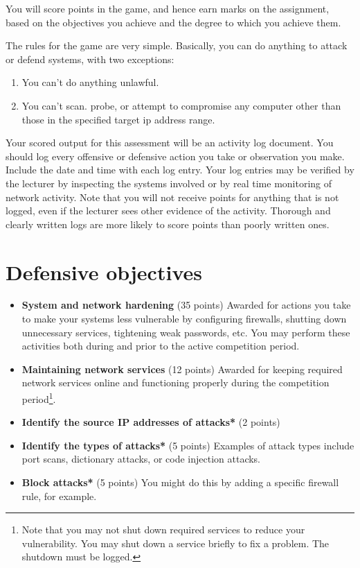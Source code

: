 \documentclass{article}   	%
\begin{document}
You will score points in the game, and hence earn marks on the assignment, based on the objectives you achieve and the degree to which you achieve them.

The rules for the game are very simple.  Basically, you can do anything to attack or defend systems, with two exceptions:

\begin{enumerate}
  \item You can't do anything unlawful.
  \item You can't scan. probe, or attempt to compromise any computer other than those in the specified target ip address range.
	  \end{enumerate}

Your scored output for this assessment will be an activity log document. You should log every offensive or defensive action you take or observation you make.  Include the date and  time with each log entry.  Your log entries may be verified by the lecturer by inspecting the systems involved or by real time monitoring of network activity. Note that you will not receive points for anything that is not logged, even if the lecturer sees other evidence of the activity.  Thorough and clearly written logs are more likely to score points than poorly written ones.


\section*{Defensive objectives}
\begin{itemize}
  \item \textbf{System and network hardening} (35 points)  Awarded for actions you take to make your systems less vulnerable by configuring firewalls, shutting down unnecessary services, tightening weak passwords, etc.  You may perform these activities both during and prior to the active competition period.
  \item \textbf{Maintaining network services} (12 points)  Awarded for keeping required network services online and functioning properly during the competition period\footnote{Note that you may not shut down required services to reduce your vulnerability. You may shut down a service briefly to fix a problem. The shutdown must be logged.}.
  \item \textbf{Identify the source IP addresses of attacks*} (2 points)
  \item \textbf{Identify the types of attacks*} (5 points) Examples of attack types include port scans, dictionary attacks, or code injection attacks.
  \item \textbf{Block attacks*} (5 points) You might do this by adding a specific firewall rule, for example.
  
\end{itemize}
\end{document}
